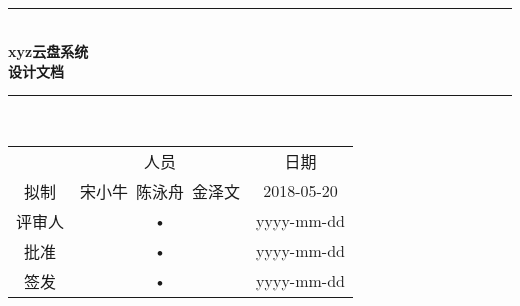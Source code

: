 \documentclass[bachelor]{ustcthesis}
\newcommand{\docname}{xyz云盘系统}
\newcommand{\HRule}{\rule{\linewidth}{0.5mm}}
\begin{document}
\begin{titlepage}
\begin{center}
~\\[5cm]
\HRule \\[0.4cm]
{\huge \bfseries \docname\\设计文档}\\[0.4cm]
\HRule \\[1.5cm]

\begin{tabular}{ccc}
  & 人员 & 日期 \\ 
拟制 & 宋小牛\ 陈泳舟\ 金泽文 & 2018-05-20 \\ 
评审人 & • & yyyy-mm-dd \\ 
批准 & • & yyyy-mm-dd \\ 
签发 & • & yyyy-mm-dd \\ 
\end{tabular} 

\end{center}
\end{titlepage}



\frontmatter

\tableofcontents
\listoffigures
\listoftables
% 

\mainmatter











% 
% 
% 
% 
% 

\end{document}
